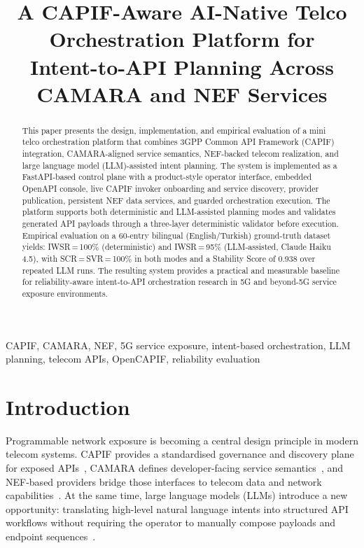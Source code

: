 \documentclass[conference]{IEEEtran}
\title{A CAPIF-Aware AI-Native Telco Orchestration Platform for\\
Intent-to-API Planning Across CAMARA and NEF Services}
\author{
\IEEEauthorblockN{T\"urkan Do\u{g}a Durak}
\IEEEauthorblockA{
Centre Tecnol\`ogic de Telecomunicacions de Catalunya (CTTC)\\
Castelldefels, Spain\\
\texttt{turkandoga.durak@cttc.es}
}
}
\begin{document}
\maketitle

\begin{abstract}
This paper presents the design, implementation, and empirical evaluation of a
mini telco orchestration platform that combines 3GPP Common API Framework
(CAPIF) integration, CAMARA-aligned service semantics, NEF-backed telecom
realization, and large language model (LLM)-assisted intent planning.
The system is implemented as a FastAPI-based control plane with a
product-style operator interface, embedded OpenAPI console, live CAPIF
invoker onboarding and service discovery, provider publication, persistent
NEF data services, and guarded orchestration execution.
The platform supports both deterministic and LLM-assisted planning modes and
validates generated API payloads through a three-layer deterministic validator
before execution.
Empirical evaluation on a 60-entry bilingual (English/Turkish) ground-truth
dataset yields: IWSR\,=\,100\% (deterministic) and IWSR\,=\,95\%
(LLM-assisted, Claude Haiku\,4.5), with SCR\,=\,SVR\,=\,100\% in both
modes and a Stability Score of 0.938 over repeated LLM runs.
The resulting system provides a practical and measurable baseline for
reliability-aware intent-to-API orchestration research in 5G and beyond-5G
service exposure environments.
\end{abstract}

\begin{IEEEkeywords}
CAPIF, CAMARA, NEF, 5G service exposure, intent-based orchestration,
LLM planning, telecom APIs, OpenCAPIF, reliability evaluation
\end{IEEEkeywords}

\section{Introduction}

Programmable network exposure is becoming a central design principle in modern
telecom systems. CAPIF provides a standardised governance and discovery plane
for exposed APIs~\cite{3gpp_capif}, CAMARA defines developer-facing service
semantics~\cite{camara2022}, and NEF-based providers bridge those interfaces
to telecom data and network capabilities~\cite{nefsim2022}.
At the same time, large language models (LLMs) introduce a new opportunity:
translating high-level natural language intents into structured API workflows
without requiring the operator to manually compose payloads and endpoint
sequences~\cite{maatouk2025,flowmind2023}.
\end{document}

